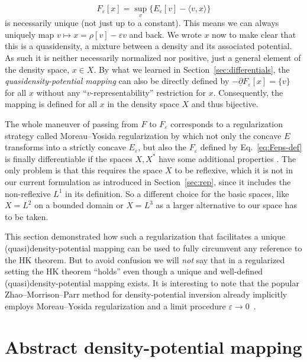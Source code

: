 \documentclass[journal=apcach,manuscript=article,layout=twocolumn]{achemso}
\newcommand{\eps}{\varepsilon}
\newcommand{\changed}[1] {{ {#1}}} %
\begin{document}
\begin{equation}\label{eq:Feps-def}
    F_\eps[x] = \sup_v \{E_\eps[v]-\langle v,x \rangle\}
\end{equation}
is necessarily unique (not just up to a constant). This means we can always uniquely map $v \mapsto x = \rho[v]-\eps v$ and back. We wrote $x$ now to make clear that this is a quasidensity, a mixture between a density and its associated potential. As such it is neither necessarily normalized nor positive, just a general element of the density space, $x\in X$. 
By what we learned in Section~\ref{sec:differentials}, the \emph{quasidensity-potential mapping} can also be directly defined by $-\underline\partial F_\eps[x]= \{v\}$ for all $x$ without any  ``$v$-representability'' restriction for $x$. Consequently, the mapping is defined for all $x$ in the density space $X$ and thus bijective.

The whole maneuver of passing from $F$ to $F_\eps$ corresponds to a regularization strategy called Moreau--Yosida regularization \cite{Kvaal2014,Kvaal2022-MY} by which not only the concave $E$ transforms into a strictly concave $E_\eps$, but also the $F_\eps$ defined by Eq.~\eqref{eq:Feps-def} is finally differentiable if the spaces $X,X^*$ have some additional properties \cite[Theorem~9]{KSpaper2018}.
The only problem is that this requires the space $X$ to be reflexive, which it is not in our current formulation as introduced in Section~\ref{sec:rep}, since it includes the non-reflexive $L^1$ in its definition. So a different choice for the basic spaces, like $X=L^2$ on a bounded domain \cite{Kvaal2014} or $X=L^3$ as a larger alternative to our space\cite{KSpaper2018} has to be taken.

This section demonstrated how such a regularization that facilitates a unique (quasi)density-potential mapping can be used to fully circumvent any reference to the HK theorem. But to avoid confusion we will \emph{not} say that in a regularized setting the HK theorem ``holds'' even though a unique and well-defined (quasi)density-potential mapping exists.
\changed{It is interesting to note that the popular Zhao--Morrison--Parr method for density-potential inversion already implicitly employs Moreau--Yosida regularization and a limit procedure $\eps\to 0$~\cite{Penz2022ZMP}.}

\section{Abstract density-potential mapping}
\label{sec:abstract-dens-pot}
\end{document}
